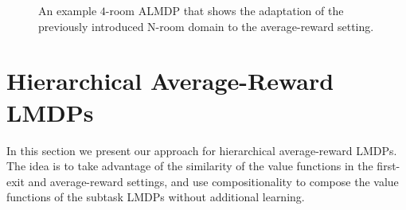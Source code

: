 \begin{figure}
  \begin{center}
  
  \end{center}
  \caption{An example $4$-room ALMDP that shows the adaptation of the previously introduced N-room domain to the average-reward setting. \\}
  \label{fig:halmdps_example}
\end{figure}

\section{Hierarchical Average-Reward LMDPs}

In this section we present our approach for hierarchical average-reward LMDPs. The idea is to take advantage of the similarity of the value functions in the first-exit and average-reward settings, and use compositionality to compose the value functions of the subtask LMDPs without additional learning.


